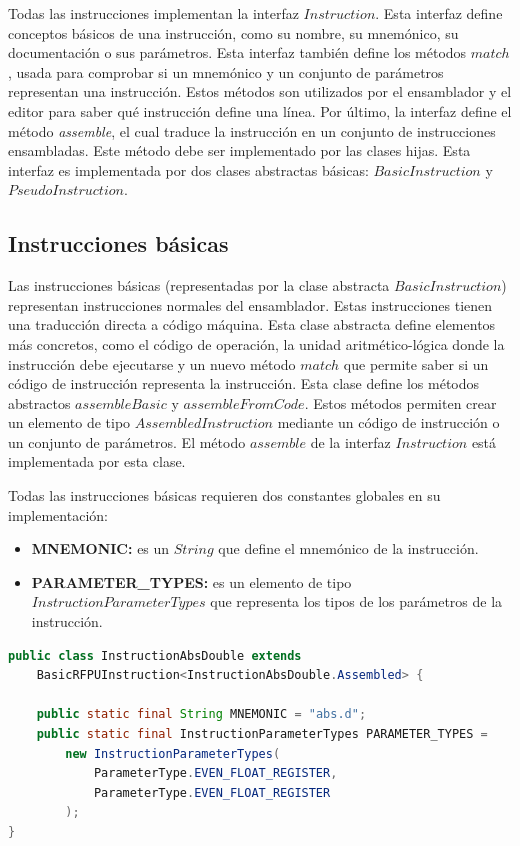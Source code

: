 Todas las instrucciones implementan la interfaz $Instruction$.
Esta interfaz define conceptos básicos de una instrucción,
como su nombre, su mnemónico, su documentación o sus parámetros.
Esta interfaz también define los métodos $match$,
usada para comprobar si un mnemónico y un conjunto de parámetros
representan una instrucción.
Estos métodos son utilizados por el ensamblador y el editor para saber qué
instrucción define una línea.
Por último, la interfaz define el método \textit{assemble}, el
cual traduce la instrucción en un conjunto de instrucciones ensambladas.
Este método debe ser implementado por las clases hijas.
Esta interfaz es implementada por dos clases abstractas básicas:
$BasicInstruction$ y $PseudoInstruction$.

\subsection{Instrucciones básicas}\label{subsec:instrucciones-basicas}

Las instrucciones básicas (representadas por la clase abstracta
$BasicInstruction$) representan instrucciones normales del ensamblador.
Estas instrucciones tienen una traducción directa a código máquina.
Esta clase abstracta define elementos más concretos, como el código de operación,
la unidad aritmético-lógica donde la instrucción debe ejecutarse y
un nuevo método $match$ que permite saber si un código de instrucción
representa la instrucción.
Esta clase define los métodos abstractos $assembleBasic$
y $assembleFromCode$.
Estos métodos permiten crear un elemento de tipo $AssembledInstruction$
mediante un código de instrucción o un conjunto de parámetros.
El método $assemble$ de la interfaz $Instruction$
está implementada por esta clase.

\noindent Todas las instrucciones básicas requieren dos
constantes globales en su implementación:
\begin{itemize}
    \item \textbf{MNEMONIC:} es un $String$ que define
    el mnemónico de la instrucción.
    \item \textbf{PARAMETER\_TYPES:} es un elemento de tipo
    $InstructionParameterTypes$ que representa
    los tipos de los parámetros de la instrucción.
\end{itemize}

\begin{lstlisting}[language=Java,style=java,frame=single,label={lst:basic-instruction}]
public class InstructionAbsDouble extends
    BasicRFPUInstruction<InstructionAbsDouble.Assembled> {

    public static final String MNEMONIC = "abs.d";
    public static final InstructionParameterTypes PARAMETER_TYPES =
        new InstructionParameterTypes(
            ParameterType.EVEN_FLOAT_REGISTER,
            ParameterType.EVEN_FLOAT_REGISTER
        );
}
\end{lstlisting}

